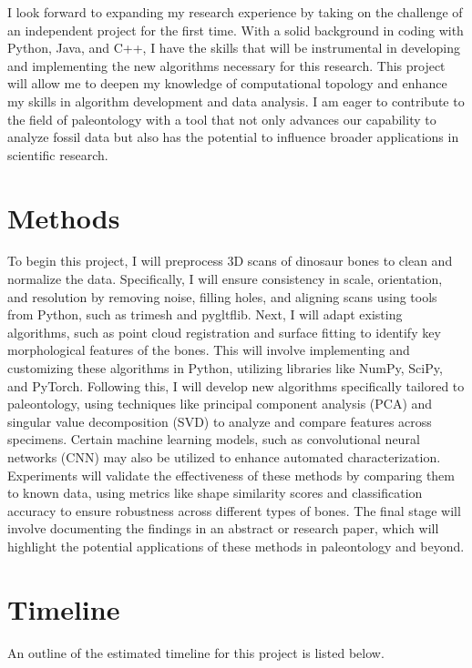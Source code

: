 \documentclass[12pt]{article}
\begin{document}
I look forward to expanding my research experience by taking on the challenge of
an independent project for the first time. With a solid background in
coding with Python, Java, and C++, I have the skills that will be instrumental 
in developing and implementing the new algorithms necessary for this research. 
This project will allow me to deepen my knowledge of computational topology and 
enhance my skills in algorithm development and data analysis. I am eager to 
contribute to the field of paleontology with a tool that not only advances our 
capability to analyze fossil data but also has the potential to influence broader 
applications in scientific research.

\section{Methods}
To begin this project, I will preprocess 3D scans of dinosaur bones to clean and
normalize the data. Specifically, I will ensure consistency in scale, orientation, and resolution
by removing noise, filling holes, and aligning scans using tools from Python,
such as trimesh and pygltflib. Next, I will adapt existing algorithms, such as
point cloud registration and surface fitting to identify key morphological
features of the bones. This will involve implementing and customizing these
algorithms in Python, utilizing libraries like NumPy, SciPy, and PyTorch.
Following this, I will develop new algorithms specifically tailored to
paleontology, using techniques like principal component analysis (PCA) and
singular value decomposition (SVD) to analyze and compare features across specimens.
Certain machine learning models, such as convolutional neural networks (CNN) may also
be utilized to enhance automated characterization. Experiments will validate the
effectiveness of these methods by comparing them to known data, using metrics
like shape similarity scores and classification accuracy to ensure robustness
across different types of bones. The final stage will involve documenting the
findings in an abstract or research paper, which will highlight the
potential applications of these methods in paleontology and beyond.

\section{Timeline}
An outline of the estimated timeline for this project is listed below.
\end{document}
